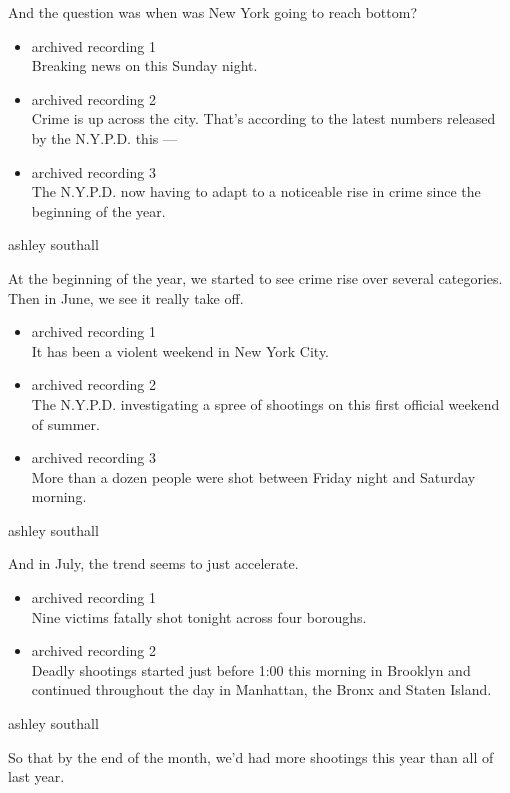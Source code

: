 And the question was when was New York going to reach bottom?

\begin{itemize}
\item
  archived recording 1\\
  Breaking news on this Sunday night.
\item
  archived recording 2\\
  Crime is up across the city. That's according to the latest numbers
  released by the N.Y.P.D. this ---
\item
  archived recording 3\\
  The N.Y.P.D. now having to adapt to a noticeable rise in crime since
  the beginning of the year.
\end{itemize}

ashley southall

At the beginning of the year, we started to see crime rise over several
categories. Then in June, we see it really take off.

\begin{itemize}
\item
  archived recording 1\\
  It has been a violent weekend in New York City.
\item
  archived recording 2\\
  The N.Y.P.D. investigating a spree of shootings on this first official
  weekend of summer.
\item
  archived recording 3\\
  More than a dozen people were shot between Friday night and Saturday
  morning.
\end{itemize}

ashley southall

And in July, the trend seems to just accelerate.

\begin{itemize}
\item
  archived recording 1\\
  Nine victims fatally shot tonight across four boroughs.
\item
  archived recording 2\\
  Deadly shootings started just before 1:00 this morning in Brooklyn and
  continued throughout the day in Manhattan, the Bronx and Staten
  Island.
\end{itemize}

ashley southall

So that by the end of the month, we'd had more shootings this year than
all of last year.

